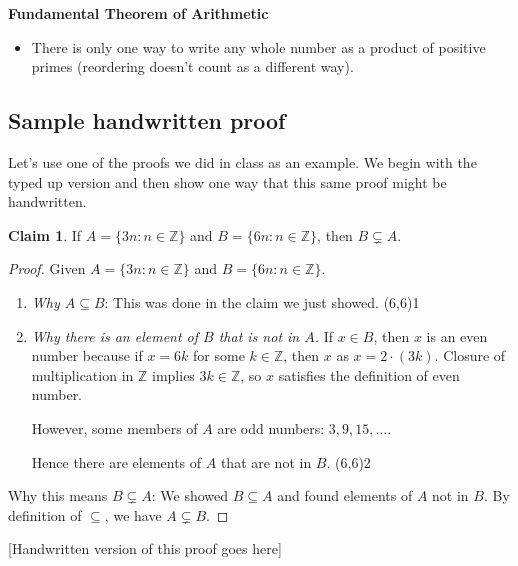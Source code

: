 \documentclass[11pt]{article}
\newcommand{\Z}{\mathbb{Z}}
\renewcommand\subset\subseteq
\newcommand\st{:}
\theoremstyle{definition}
\newtheorem*{claim*}{Claim}
\newcommand\qedpart[1]{ \hfill \framebox(6,6){\tiny #1}}
\begin{document}
{\bf Fundamental Theorem of Arithmetic} 
\vspace*{-6pt}
\begin{itemize}\item[] There is only one way to write any whole number as a product of positive primes (reordering doesn't count as a different way).
\end{itemize}



\newpage
\subsection{Sample handwritten proof}

Let's use one of the proofs we did in class as an example.  We begin with the typed up version and then show one way that this same proof might be handwritten.

\begin{mdframed}
\begin{claim*}
If $A=\{ 3n \st n \in \Z\}$ and $B=\{ 6n \st n\in \Z\}$, then $B\subsetneq A$.
\end{claim*}
\begin{proof}
Given $A=\{ 3n \st n \in \Z\}$ and $B=\{ 6n \st n\in \Z\}$. 

\begin{enumerate}
\item {\it Why $A\subset B$}: This was done in the claim we just showed. \qedpart{1}

\item {\it Why there is an element of $B$ that is not in $A$.}
If $x\in B$, then $x$ is an even number because if $x=6k$ for some $k\in\Z$, then $x$ as $x=2\cdot (3k)$. Closure of multiplication in $\Z$ implies $3k\in \Z$, so $x$ satisfies the definition of even number. 

However, some members of $A$ are odd numbers: $3, 9, 15, \dots $. 

Hence there are elements of $A$ that are not in $B$. \qedpart{2}

\end{enumerate}
Why this means $B\subsetneq A$: We showed $B\subset A$ and found elements of $A$ not in $B$. By definition of $\subseteq$, we have $A\subsetneq B$.
\end{proof}
\end{mdframed}

\begin{mdframed}
{}
[Handwritten version of this proof goes here]
\end{mdframed}
\end{document}
